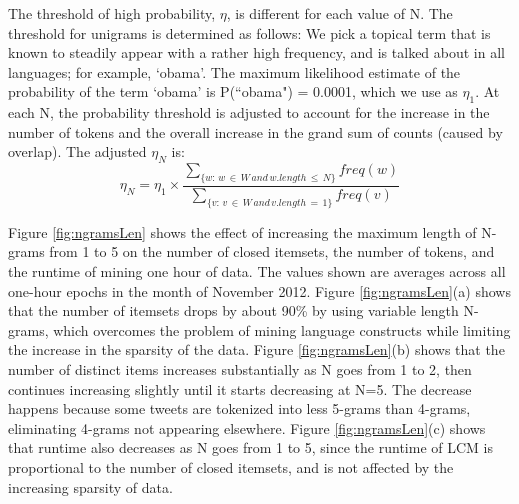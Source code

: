 \documentclass{sig-alternate}
\begin{document}
The threshold of high probability, $\eta$, is different for each value of N. 
The threshold for unigrams is determined as follows: 
We pick a topical term that is known to  steadily  appear with a rather high frequency, 
and is talked about in all languages; for example, `obama'. 
The maximum likelihood estimate of the probability of the term `obama' 
is P(``obama") = 0.0001, which we use as $\eta_1$.
At each N, the probability threshold is adjusted to account for the increase
in the number of tokens and the overall increase in the grand sum of counts (caused by overlap).
The adjusted $\eta_N$ is:
\begin{equation}\eta_N = \eta_1 \times \frac{\sum_{\{w:\, w \,\in\, W\, and\, w.length \,\le\, N\}}{freq(w)}}{\sum_{\{v:\, v\, \in\, W \,and \,v.length\,=\,1\}}{freq(v)}}\end{equation}


Figure \ref{fig:ngramsLen} shows the effect of increasing the maximum length
of N-grams from 1 to 5 on 
the number of closed itemsets,
the number of tokens, 
and the runtime of mining one hour of data.
The values shown are averages across all one-hour epochs in the month of
November 2012.
Figure \ref{fig:ngramsLen}(a) shows that the number of itemsets 
drops by about 90\% by using variable length N-grams,
which overcomes the problem of mining language constructs
while limiting the increase in the sparsity of the data.
Figure \ref{fig:ngramsLen}(b) shows that the number of distinct items
increases substantially as N goes from 1 to 2, then continues increasing
slightly until it starts decreasing at N=5.
The decrease happens because 
some tweets are tokenized into less 5-grams than 4-grams,
eliminating 4-grams not appearing elsewhere.
Figure \ref{fig:ngramsLen}(c) shows that runtime also decreases as N goes
from 1 to 5, since the runtime of LCM  is proportional to the number of closed
itemsets, %
and is not affected by the increasing sparsity of data.
\end{document}

